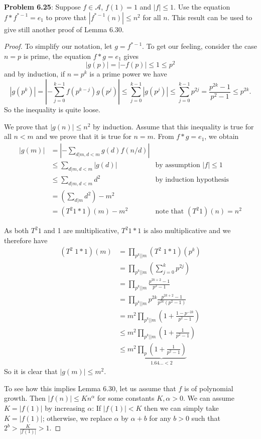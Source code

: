 \documentclass[12pt]{article}
\newcommand{\A}{\mathcal{A}}
\newcommand{\Abs}[1]{\left| #1 \right|}
\begin{document}
\fi

\textbf{Problem 6.25}: Suppose $f \in \A$, $f(1) = 1$ and $|f| \leq 1$. Use the equation $f * f^{*-1} = e_1$ to prove that $|f^{*-1}(n)| \leq n^2$ for all $n$. This result can be used to give still another proof of Lemma 6.30.

\begin{proof}
To simplify our notation, let $g = f^{*-1}$. To get our feeling, consider the case $n = p$ is prime, the equation $f * g = e_1$ gives
$$|g(p)| = |-f(p)| \leq 1 \leq p^2$$
and by induction, if $n = p^k$ is a prime power we have
$$|g(p^k)| = \Abs{ -\sum_{j = 0}^{k-1} f(p^{k-j}) g(p^j) } \leq \sum_{j = 0}^{k - 1} |g(p^j)| \leq \sum_{j = 0}^{k - 1} p^{2j} = \frac{p^{2k}-1}{p^2 - 1} \leq p^{2k}.$$
So the inequality is quite loose.

We prove that $|g(n)| \leq n^2$ by induction. Assume that this inequality is true for all $n < m$ and we prove that it is true for $n = m$. From $f * g = e_1$, we obtain
\begin{align*}
|g(m)| &= \Abs{ -\sum_{d | m, d < m} g(d) f(n/d) }\\
&\leq \sum_{d | m, d < m} |g(d)| &\text{by assumption } |f| \leq 1\\
&\leq \sum_{d | m, d < m} d^2 &\text{by induction hypothesis}\\
&= \left( \sum_{d | m} d^2 \right) - m^2\\
&= (T^2 1 * 1)(m) - m^2 &\text{note that } (T^2 1)(n) = n^2
\end{align*}

As both $T^2 1$ and 1 are multiplicative, $T^2 1 * 1$ is also multiplicative and we therefore have
\begin{align*}
(T^2 \; 1 * 1)(m) &= \prod_{p^k || m} (T^2 \; 1 * 1)(p^k)\\
&= \prod_{p^k || m} \left( \sum_{j = 0}^{k} p^{2j} \right)\\
&= \prod_{p^k || m} \frac{p^{2k+2} - 1}{p^2 - 1}\\
&= \prod_{p^k || m} p^{2k} \frac{p^{2k+2} - 1}{p^{2k}(p^2 - 1)}\\
&= m^2 \prod_{p^k || m} \left( 1 + \frac{1 - p^{-2k}}{p^2 - 1} \right)\\
&\leq m^2 \prod_{p^k || m} \left( 1 + \frac{1}{p^2 - 1} \right)\\
&\leq m^2 \underbrace{\prod_p \left( 1 + \frac{1}{p^2 - 1} \right)}_{1.64... < 2}
\end{align*}
So it is clear that $|g(m)| \leq m^2$.

To see how this implies Lemma 6.30, let us assume that $f$ is of polynomial growth. Then $|f(n)| \leq K n^\alpha$ for some constants $K, \alpha > 0$. We can assume $K = |f(1)|$ by increasing $\alpha$: If $|f(1)| < K$ then we can simply take $K = |f(1)|$; otherwise, we replace $\alpha$ by $\alpha + b$ for any $b > 0$ such that $2^b > \frac{K}{|f(1)|} > 1$.


\end{proof}
\end{document}
